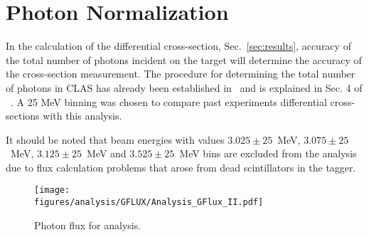 \section{Photon Normalization}\label{sec:analysis.gflux}
In the calculation of the differential cross-section, Sec.~\ref{sec:results}, accuracy of the total number of photons incident on the target will determine the accuracy of the cross-section measurement. The procedure for determining the total number of photons in CLAS has already been established in~\cite{clas.gflux} and is explained in Sec. 4 of ~\cite{g12note}. 
%
%
A 25 MeV binning was chosen to compare past experiments differential cross-sections with this analysis.

It should be noted that beam energies with values $3.025 \pm 25$~MeV, $3.075 \pm25$~MeV, $3.125 \pm25$~MeV and $3.525 \pm25$~MeV bins are excluded from the analysis due to flux calculation problems that arose from dead scintillators in the tagger. 

\begin{figure}[h!]\begin{center}
\texttt{[image: \\figures/analysis/GFLUX/Analysis\_GFlux\_II.pdf]}
\caption[Photon flux for analysis]{\label{fig:gflux}Photon flux for analysis.}
\end{center}\end{figure}
\FloatBarrier

